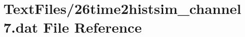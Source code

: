 \hypertarget{26time2histsim__channel7_8dat}{}\section{Text\+Files/26time2histsim\+\_\+channel7.dat File Reference}
\label{26time2histsim__channel7_8dat}
